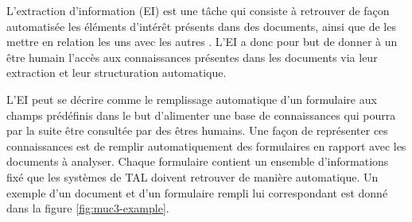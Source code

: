 \documentclass[PhD-Yoann-Dupont.tex]{subfiles}
\begin{document}
L'extraction d'information (EI) est une tâche qui consiste à retrouver de façon automatisée les éléments d'intérêt présents dans des documents, ainsi que de les mettre en relation les uns avec les autres \citep{yangarber2000automatic}. L'EI a donc pour but de donner à un être humain l'accès aux connaissances présentes dans les documents via leur extraction et leur structuration automatique.

L'EI peut se décrire comme le remplissage automatique d'un formulaire aux champs prédéfinis dans le but d'alimenter une base de connaissances \citep{pazienza1997information} qui pourra par la suite être consultée par des êtres humains. Une façon de représenter ces connaissances est de remplir automatiquement des formulaires en rapport avec les documents à analyser. Chaque formulaire contient un ensemble d'informations fixé que les systèmes de TAL doivent retrouver de manière automatique. Un exemple d'un document et d'un formulaire rempli lui correspondant est donné dans la figure \ref{fig:muc3-example}.
\end{document}
